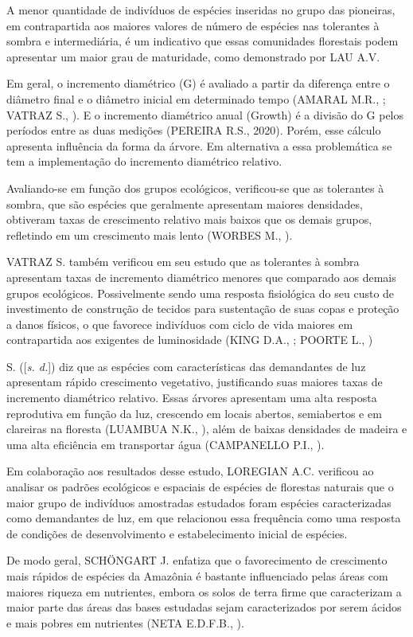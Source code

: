 \documentclass[
]{article}
\begin{document}
A menor quantidade de indivíduos de espécies inseridas no grupo das
pioneiras, em contrapartida aos maiores valores de número de espécies
nas tolerantes à sombra e intermediária, é um indicativo que essas
comunidades florestais podem apresentar um maior grau de maturidade,
como demonstrado por LAU A.V.

Em geral, o incremento diamétrico (G) é avaliado a partir da diferença
entre o diâmetro final e o diâmetro inicial em determinado tempo (AMARAL
M.R., ; VATRAZ S., ). E o incremento diamétrico anual (Growth) é a
divisão do G pelos períodos entre as duas medições (PEREIRA R.S., 2020).
Porém, esse cálculo apresenta influência da forma da árvore. Em
alternativa a essa problemática se tem a implementação do incremento
diamétrico relativo.

Avaliando-se em função dos grupos ecológicos, verificou-se que as
tolerantes à sombra, que são espécies que geralmente apresentam maiores
densidades, obtiveram taxas de crescimento relativo mais baixos que os
demais grupos, refletindo em um crescimento mais lento (WORBES M., ).

VATRAZ S. também verificou em seu estudo que as tolerantes à sombra
apresentam taxas de incremento diamétrico menores que comparado aos
demais grupos ecológicos. Possivelmente sendo uma resposta fisiológica
do seu custo de investimento de construção de tecidos para sustentação
de suas copas e proteção a danos físicos, o que favorece indivíduos com
ciclo de vida maiores em contrapartida aos exigentes de luminosidade
(KING D.A., ; POORTE L., )

S. ({[}\emph{s. d.}{]}) diz que as espécies com características das
demandantes de luz apresentam rápido crescimento vegetativo,
justificando suas maiores taxas de incremento diamétrico relativo. Essas
árvores apresentam uma alta resposta reprodutiva em função da luz,
crescendo em locais abertos, semiabertos e em clareiras na floresta
(LUAMBUA N.K., ), além de baixas densidades de madeira e uma alta
eficiência em transportar água (CAMPANELLO P.I., ).

Em colaboração aos resultados desse estudo, LOREGIAN A.C. verificou ao
analisar os padrões ecológicos e espaciais de espécies de florestas
naturais que o maior grupo de indivíduos amostradas estudados foram
espécies caracterizadas como demandantes de luz, em que relacionou essa
frequência como uma resposta de condições de desenvolvimento e
estabelecimento inicial de espécies.

De modo geral, SCHÖNGART J. enfatiza que o favorecimento de crescimento
mais rápidos de espécies da Amazônia é bastante influenciado pelas áreas
com maiores riqueza em nutrientes, embora os solos de terra firme que
caracterizam a maior parte das áreas das bases estudadas sejam
caracterizados por serem ácidos e mais pobres em nutrientes (NETA
E.D.F.B., ).
\end{document}

